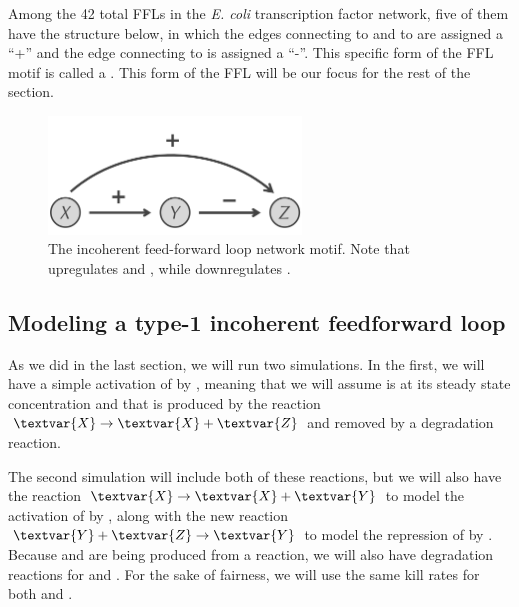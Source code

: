 Among the 42 total FFLs in the \textit{E. coli} transcription factor network, five of them have the structure below, in which the edges connecting  to  and  to  are assigned a ``+'' and the edge connecting  to  is assigned a ``-''. This specific form of the FFL motif is  called a . This form of the FFL will be our focus for the rest of the section.\\

\begin{qbox}\end{qbox} 

\begin{figure}[h]
\centering
\mySfFamily
\includegraphics[width = 0.6\textwidth]{../images/type-1_incoherent_feed-forward_loop.png}
\caption{The incoherent feed-forward loop network motif. Note that  upregulates  and , while  downregulates .}
\label{fig:type-1_incoherent_feed-forward_loop}
\end{figure}

\FloatBarrier
{}
\subsection{Modeling a type-1 incoherent feedforward loop}

As we did in the last section, we will run two simulations. In the first, we will have a simple activation of  by , meaning that we will assume  is at its steady state concentration and that  is produced by the reaction $\textvar{X} \rightarrow \textvar{X} + \textvar{Z}$ and removed by a degradation reaction.

The second simulation will include both of these reactions, but we will also have the reaction $\textvar{X} \rightarrow \textvar{X} + \textvar{Y}$ to model the activation of  by , along with the new reaction $\textvar{Y} + \textvar{Z} \rightarrow \textvar{Y}$ to model the repression of  by . Because  and  are being produced from a reaction, we will also have degradation reactions for  and . For the sake of fairness, we will use the same kill rates for both  and .

